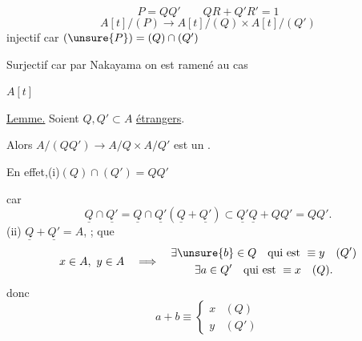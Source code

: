 \[
P=QQ'\qquad QR+Q'R'=1
\]
\[
A[t]/(P)\longrightarrow A[t]/(Q)\times A[t]/(Q')
\]
injectif car $(\unsure{P})=(Q)\cap(Q')$

Surjectif car par Nakayama on est ramené au cas

$A[t]$

\uline{Lemme.} Soient $Q,Q'\subset A$ \uline{ étrangers}.

Alors $A/(QQ')\longrightarrow A/Q\times A/Q'$ est un .

En effet,\quad (i)\quad $(Q)\cap(Q')=QQ'$

car
\[
\underline Q\cap\underline {Q'}=\underline Q\cap\underline {Q'}(\underline Q+\underline {Q'})
\subset\underline {Q'}\underline Q+QQ'=QQ'.
\]
(ii) $\underline Q+\underline {Q'}=A$, ;  que
\[
x\in A,\ y\in A\quad\Longrightarrow\quad
\begin{gathered}
\exists\unsure{b}\in Q\quad\text{qui est }\equiv y\quad(Q')\\
\exists a\in Q'\quad\text{qui est }\equiv x\quad(Q).
\end{gathered}
\]
donc
\[
a+b\equiv\begin{cases}x&(Q)\\y&(Q')\end{cases}
\]


